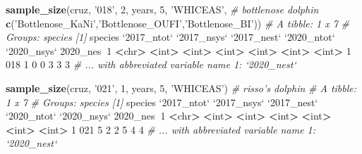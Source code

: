 \documentclass[
]{book}
\newenvironment{Shaded}{\begin{snugshade}}{\end{snugshade}}
\newcommand{\CommentTok}[1]{\textcolor[rgb]{0.56,0.35,0.01}{\textit{#1}}}
\newcommand{\DataTypeTok}[1]{\textcolor[rgb]{0.13,0.29,0.53}{#1}}
\newcommand{\DecValTok}[1]{\textcolor[rgb]{0.00,0.00,0.81}{#1}}
\newcommand{\ErrorTok}[1]{\textcolor[rgb]{0.64,0.00,0.00}{\textbf{#1}}}
\newcommand{\KeywordTok}[1]{\textcolor[rgb]{0.13,0.29,0.53}{\textbf{#1}}}
\newcommand{\NormalTok}[1]{#1}
\newcommand{\OperatorTok}[1]{\textcolor[rgb]{0.81,0.36,0.00}{\textbf{#1}}}
\newcommand{\StringTok}[1]{\textcolor[rgb]{0.31,0.60,0.02}{#1}}
\begin{document}
\begin{Shaded}
\begin{Highlighting}[]
\KeywordTok{sample_size}\NormalTok{(cruz, }\StringTok{'018'}\NormalTok{, }\DecValTok{2}\NormalTok{, years, }\DecValTok{5}\NormalTok{, }\StringTok{'WHICEAS'}\NormalTok{, }\CommentTok{# bottlenose dolphin}
            \KeywordTok{c}\NormalTok{(}\StringTok{'Bottlenose_KaNi'}\NormalTok{,}\StringTok{'Bottlenose_OUFI'}\NormalTok{,}\StringTok{'Bottlenose_BI'}\NormalTok{))}
\CommentTok{# A tibble: 1 x 7}
\CommentTok{# Groups:   species [1]}
\NormalTok{  species }\StringTok{`}\DataTypeTok{2017_ntot}\StringTok{`} \StringTok{`}\DataTypeTok{2017_nsys}\StringTok{`} \StringTok{`}\DataTypeTok{2017_nest}\StringTok{`} \StringTok{`}\DataTypeTok{2020_ntot}\StringTok{`} \StringTok{`}\DataTypeTok{2020_nsys}\StringTok{`} \DecValTok{2020}\NormalTok{_nes}\OperatorTok{~}\DecValTok{1}
  \OperatorTok{<}\NormalTok{chr}\OperatorTok{>}\StringTok{         }\ErrorTok{<}\NormalTok{int}\OperatorTok{>}\StringTok{       }\ErrorTok{<}\NormalTok{int}\OperatorTok{>}\StringTok{       }\ErrorTok{<}\NormalTok{int}\OperatorTok{>}\StringTok{       }\ErrorTok{<}\NormalTok{int}\OperatorTok{>}\StringTok{       }\ErrorTok{<}\NormalTok{int}\OperatorTok{>}\StringTok{      }\ErrorTok{<}\NormalTok{int}\OperatorTok{>}
\DecValTok{1} \DecValTok{018}               \DecValTok{1}           \DecValTok{0}           \DecValTok{0}           \DecValTok{3}           \DecValTok{3}          \DecValTok{3}
\CommentTok{# ... with abbreviated variable name 1: `2020_nest`}

\KeywordTok{sample_size}\NormalTok{(cruz, }\StringTok{'021'}\NormalTok{, }\DecValTok{1}\NormalTok{, years, }\DecValTok{5}\NormalTok{, }\StringTok{'WHICEAS'}\NormalTok{) }\CommentTok{# risso's dolphin}
\CommentTok{# A tibble: 1 x 7}
\CommentTok{# Groups:   species [1]}
\NormalTok{  species }\StringTok{`}\DataTypeTok{2017_ntot}\StringTok{`} \StringTok{`}\DataTypeTok{2017_nsys}\StringTok{`} \StringTok{`}\DataTypeTok{2017_nest}\StringTok{`} \StringTok{`}\DataTypeTok{2020_ntot}\StringTok{`} \StringTok{`}\DataTypeTok{2020_nsys}\StringTok{`} \DecValTok{2020}\NormalTok{_nes}\OperatorTok{~}\DecValTok{1}
  \OperatorTok{<}\NormalTok{chr}\OperatorTok{>}\StringTok{         }\ErrorTok{<}\NormalTok{int}\OperatorTok{>}\StringTok{       }\ErrorTok{<}\NormalTok{int}\OperatorTok{>}\StringTok{       }\ErrorTok{<}\NormalTok{int}\OperatorTok{>}\StringTok{       }\ErrorTok{<}\NormalTok{int}\OperatorTok{>}\StringTok{       }\ErrorTok{<}\NormalTok{int}\OperatorTok{>}\StringTok{      }\ErrorTok{<}\NormalTok{int}\OperatorTok{>}
\DecValTok{1} \DecValTok{021}               \DecValTok{5}           \DecValTok{2}           \DecValTok{2}           \DecValTok{5}           \DecValTok{4}          \DecValTok{4}
\CommentTok{# ... with abbreviated variable name 1: `2020_nest`}


\end{Highlighting}
\end{Shaded}
\end{document}
